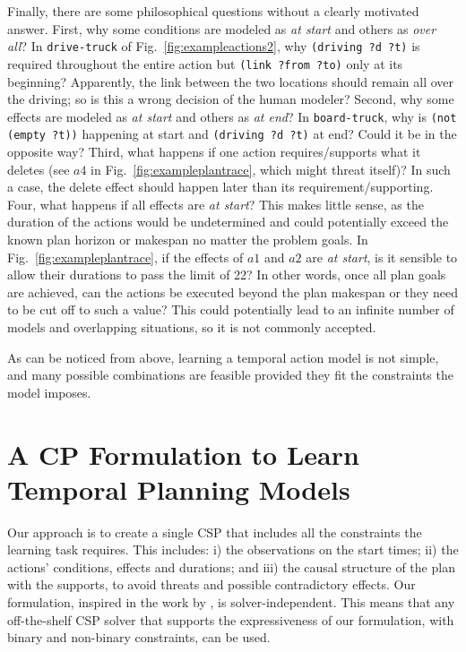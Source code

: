 \documentclass[runningheads]{llncs}
\begin{document}
Finally, there are some philosophical questions without a clearly motivated answer. First, why some conditions are modeled as \emph{at start} and others as \emph{over all}? In \texttt{drive-truck} of Fig.~\ref{fig:exampleactions2}, why \texttt{(driving ?d ?t)} is required throughout the entire action but \texttt{(link ?from ?to)} only at its beginning? Apparently, the link between the two locations should remain all over the driving; so is this a wrong decision of the human modeler?
Second, why some effects are modeled as \emph{at start} and others as \emph{at end}? In \texttt{board-truck}, why is \texttt{(not (empty ?t))} happening at start and \texttt{(driving ?d ?t)} at end? Could it be in the opposite way?
Third, what happens if one action requires/supports what it deletes (see $a4$ in Fig.~\ref{fig:exampleplantrace}, which might threat itself)? In such a case, the delete effect should happen later than its requirement/supporting.
Four, what happens if all effects are \emph{at start}? This makes little sense, as the duration of the actions would be undetermined and could potentially exceed the known plan horizon or makespan no matter the problem goals. In Fig.~\ref{fig:exampleplantrace}, if the effects of $a1$ and $a2$ are \emph{at start}, is it sensible to allow their durations to pass the limit of 22? In other words, once all plan goals are achieved, can the actions be executed beyond the plan makespan or they need to be cut off to such a value? This could potentially lead to an infinite number of models and overlapping situations, so it is not commonly accepted.

As can be noticed from above, learning a temporal action model is not simple, and many possible combinations are feasible provided they fit the constraints the model imposes.



\section{A CP Formulation to Learn Temporal Planning Models}
\label{sec:CPformulation}

Our approach is to create a single CSP that includes all the constraints the learning task requires. This includes: i) the observations on the start times; ii) the actions' conditions, effects and durations; and iii) the causal structure of the plan with the supports, to avoid threats and possible contradictory effects. Our formulation, inspired in the work by \cite{garrido2009constraint}, is solver-independent. This means that any off-the-shelf CSP solver that supports the expressiveness of our formulation, with binary and non-binary constraints, can be used.
\end{document}
